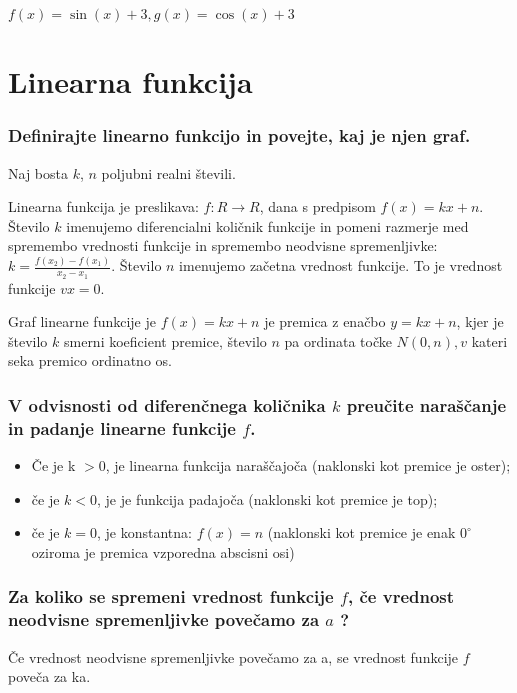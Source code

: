 \documentclass{article}
\begin{document}
$f(x)=\sin (x)+3, g(x)=\cos (x)+3$

\section{Linearna funkcija}
\subsubsection*{Definirajte linearno funkcijo in povejte, kaj je njen graf.}

Naj bosta $k$, $n$ poljubni realni števili. 

Linearna funkcija je preslikava: $f: R \rightarrow R$, dana s predpisom $f(x)=k x+n$. Število $k$ imenujemo diferencialni količnik funkcije in pomeni razmerje med spremembo vrednosti funkcije in spremembo neodvisne spremenljivke: $k=\frac{f\left(x_{2}\right)-f\left(x_{1}\right)}{x_{2}-x_{1}}$. Število $n$ imenujemo začetna vrednost funkcije. To je vrednost funkcije $v x=0$.

Graf linearne funkcije je $f(x)=k x+n$ je premica z enačbo $y=k x+n$, kjer je število $k$ smerni koeficient premice, število $n$ pa ordinata točke $N(0, n), v$ kateri seka premico ordinatno os.

\subsubsection*{V odvisnosti od diferenčnega količnika $k$ preučite naraščanje in padanje linearne funkcije $f$.}
\begin{itemize}
    \item Če je k $>0$, je linearna funkcija naraščajoča (naklonski kot premice je oster);
    \item če je $k<0$, je je funkcija padajoča (naklonski kot premice je top);
    \item če je $k=0$, je konstantna: $f(x)=n$ (naklonski kot premice je enak $0^{\circ}$ oziroma je premica vzporedna abscisni osi)
\end{itemize}
\subsubsection*{Za koliko se spremeni vrednost funkcije $f$, če vrednost neodvisne spremenljivke povečamo za $a$ ?}

Če vrednost neodvisne spremenljivke povečamo za a, se vrednost funkcije $f$ poveča za ka.
\end{document}
